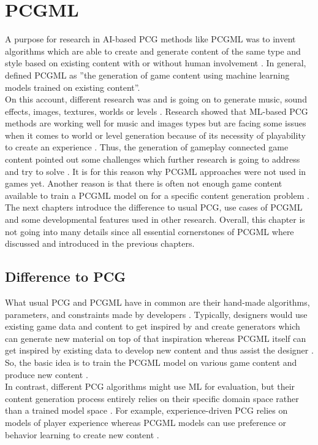 \documentclass[MGS,Master,english]{twbook}%
\begin{document}
%
%
\clearpage
\chapter{\acl{PCGML}}
A purpose for research in AI-based PCG methods like PCGML was to invent algorithms which are able to create and generate content of the same type and style based on existing content with or without human involvement \cite{ai::book} \cite{pcgml::paper}. In general, \cite{pcgml::paper} defined PCGML as ''the generation of game content using machine learning models trained on existing content''. \\
On this account, different research was and is going on to generate music, sound effects, images, textures, worlds or levels \cite{ai::book}. Research showed that ML-based PCG methods are working well for music and images types but are facing some issues when it comes to world or level generation because of its necessity of playability to create an experience \cite{ai::book}. Thus, the generation of gameplay connected game content pointed out some challenges which further research is going to address and try to solve \cite{ai::book}. It is for this reason why PCGML approaches were not used in games yet. Another reason is that there is often not enough game content available to train a PCGML model on for a specific content generation problem \cite{ai::book}. \\
The next chapters introduce the difference to usual PCG, use cases of PCGML and some developmental features used in other research. Overall, this chapter is not going into many details since all essential cornerstones of PCGML where discussed and introduced in the previous chapters.

\section{Difference to \acl{PCG}}
What usual PCG and PCGML have in common are their hand-made algorithms, parameters, and constraints made by developers \cite{pcgml::paper}. Typically, designers would use existing game data and content to get inspired by and create generators which can generate new material on top of that inspiration whereas PCGML itself can get inspired by existing data to develop new content and thus assist the designer \cite{pcgml::paper}. So, the basic idea is to train the PCGML model on various game content and produce new content \cite{pcgml::paper}. \\
In contrast, different PCG algorithms might use ML for evaluation, but their content generation process entirely relies on their specific domain space rather than a trained model space \cite{pcgml::paper}. For example, experience-driven PCG relies on models of player experience whereas PCGML models can use preference or behavior learning to create new content \cite{pcgml::paper}.
\end{document}
